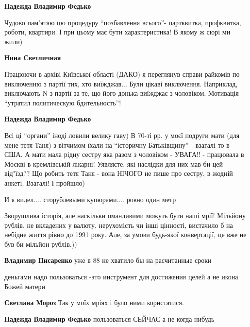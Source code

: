 \begin{itemize}
\begin{itemize}
\begin{itemize}
\textbf{Надежда Владимир Федько} 

Чудово пам'ятаю цю процедуру \enquote{позбавлення всього}- партквитка, профквитка,
роботи, квартири. І при цьому має бути характеристика! В якому ж сюрі ми жили)

\textbf{Нина Светличная} 

Працюючи в архіві Київської області (ДАКО) я переглянув справи райкомів по
виключенню з партії тих, хто виїжджав... Були цікаві виключення. Наприклад,
виключають N з партії за те, що його донька виїжджає з чоловіком. Мотивація -
\enquote{утратил политическую бдительность}!


\textbf{Надежда Владимир Федько} 

Всі ці \enquote{органи} іноді ловили велику гаву) В 70-ті рр. у моєї подруги мати (для
мене тетя Таня) з вітчимом їхали на \enquote{історичну Батьківщину} - взагалі то в США.
А мати мала рідну сестру яка разом з чоловіком - УВАГА!! - працювала в Москві в
кремлівській лікарні! Уявляєте, які наслідки для них мав би цей від"їзд?? Що
робить тетя Таня - вона НІЧОГО не пише про сестру, в жодній анкеті. Взагалі! І
пройшло)

\end{itemize} %

\end{itemize} %

И я видел.... сторублевыми купюрами.... ровно один метр


Зворушлива історія, але наскільки оманливими можуть бути наші мрії! Мільйону
рублів, не вкладених у валюту, нерухомість чи інші цінності, вистачило б на
небідне життя рівно до 1991 року. Але, за умови будь-якої конвертації, це вже
не був би мільйон рублів.))

\begin{itemize} %
\textbf{Владимир Писаренко} уже в 88 не хватило бы на расчитанные сроки

деньгами надо пользоваться -это инструмент для достижения целей а не икона Божей матери

\begin{itemize} %
\textbf{Светлана Мороз} Так у моїх мріях і було ними користатися.

\textbf{Надежда Владимир Федько} пользоваться СЕЙЧАС а не когда нибудь
\end{itemize} %


\end{itemize}
\end{itemize}
